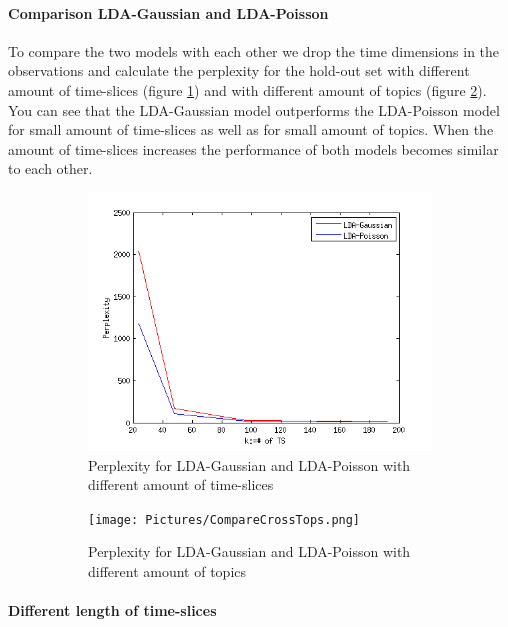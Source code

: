 \documentclass[11pt,a4paper]{article}
\begin{document}
\paragraph{Comparison LDA-Gaussian and LDA-Poisson}

To compare the two models with each other we drop the time dimensions in the observations and calculate the perplexity for the hold-out set with different amount of time-slices (figure \ref{fig:CompareTS}) and with different amount of topics (figure \ref{fig:CompareK}).
You can see that the LDA-Gaussian model outperforms the LDA-Poisson model for small amount of time-slices as well as for small amount of topics. When the amount of time-slices increases the performance of both models becomes similar to each other. 

\begin{figure}[h!]
 \centering
 \begin{subfigure}[b]{0.45\linewidth}
  \centering
  \includegraphics[width=\textwidth]{Pictures/CompareTSgausPois.png}
  \caption{Perplexity for LDA-Gaussian and LDA-Poisson with different amount of time-slices}
  \label{fig:CompareTS}
 \end{subfigure}
 \begin{subfigure}[b]{0.45\linewidth}
  \centering
  \texttt{[image: Pictures/CompareCrossTops.png]}
\caption{Perplexity for LDA-Gaussian and LDA-Poisson with different amount of topics}
  \label{fig:CompareK}
 \end{subfigure}
 \caption{}
 \label{fig:Compare}
\end{figure}


\paragraph{Different length of time-slices}
\end{document}
